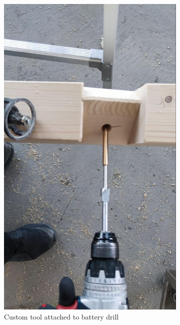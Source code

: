 \begin{figure}[!h]
    \centering
    \begin{subfigure}[b]{0.49\textwidth}
        \centering
        \includegraphics[width=\textwidth]{images/7b/img74.jpg}
        \caption{Custom tool attached to battery drill}
    \end{subfigure}
    \hfill
    \begin{subfigure}[b]{0.49\textwidth}

\end{subfigure}
\end{figure}
